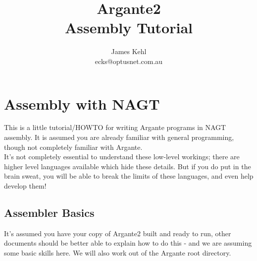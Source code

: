 \documentclass[a4paper,oneside,openany]{book}
\title{\Huge{Argante2}\\\huge{Assembly Tutorial}}
\author{
	\LARGE{James Kehl}\\
	ecks@optusnet.com.au
}
\begin{document}
\maketitle{}

\newenvironment{codefile}[1]{
	\smallskip\\\ttfamily begin #1.agt \hrulefill
	\begin{tabbing}
	\enskip\=\qquad\qquad\=\+\kill
}
{
	\end{tabbing}
	end \hrulefill\\\smallskip\\
}
\newenvironment{codetable}
{
	\smallskip\\\begin{tabular}{p{140pt}p{180pt}}
	\hline\\
}
{
	\\\hline
	\end{tabular}\smallskip\\
}
\newenvironment{codetablefig}[1]
{
	\begin{figure}[hbt]
	\caption{ #1 }
	\begin{tabular}{p{140pt}p{180pt}}
	\hline\\
}
{
	\\\hline
	\end{tabular}
	\end{figure}
	\pagebreak[4]
}
\newcommand{\codeexercise}[1]{\smallskip\\\large{Exercise.}\normalsize\quad #1\smallskip}
\chapter{Assembly with NAGT}
This is a little tutorial/HOWTO for writing Argante programs in NAGT assembly.
It is assumed you are already familiar with general programming, though not completely
familiar with Argante.\\
It's not completely essential to understand these low-level workings; there are higher
level languages available which hide these details. But if you do put in the brain sweat,
you will be able to break the limits of these languages, and even help develop them!
\section{Assembler Basics}
It's assumed you have your copy of Argante2 built and ready to run, other documents
should be better able to explain how to do this - and we are assuming some basic skills
here. We will also work out of the Argante root directory.
\end{document}
